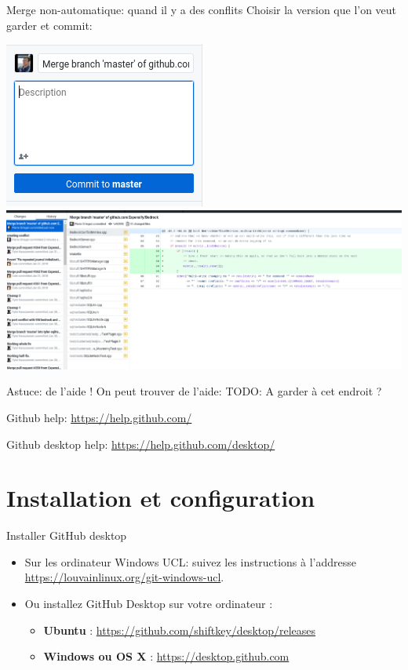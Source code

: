 \documentclass{beamer}
\begin{document}
\begin{frame}{Merge non-automatique: quand il y a des conflits}
    Choisir la version que l'on veut garder et commit:\\
    \begin{center}
	 	   \includegraphics[scale=0.4]{img/github_desktop/conflit_4.png}\\
	 	   \includegraphics[scale=0.2]{img/github_desktop/conflit_5.png}
    \end{center}
\end{frame}

\begin{frame}{Astuce: de l'aide !}
    On peut trouver de l'aide:
    TODO: A garder à cet endroit ?
    
    Github help: \url{https://help.github.com/}
        
    Github desktop help: \url{https://help.github.com/desktop/}
\end{frame}


\section{Installation et configuration}

\begin{frame}[label = {instal}]{Installer GitHub desktop}
\begin{itemize}
    \item Sur les ordinateur Windows UCL: suivez les instructions à l'addresse {\small\url{https://louvainlinux.org/git-windows-ucl}}.
    \item Ou installez GitHub Desktop sur votre ordinateur :
    \begin{itemize}
        \item \textbf{Ubuntu} : \url{https://github.com/shiftkey/desktop/releases}
        \item \textbf{Windows ou OS X} : \url{https://desktop.github.com}
    \end{itemize}
\end{itemize}
\end{frame}
\end{document}
